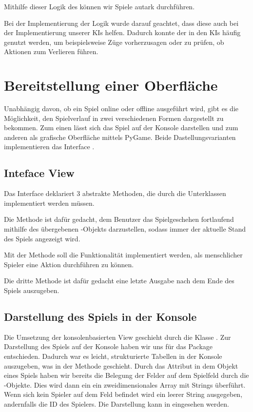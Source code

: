 Mithilfe dieser Logik des  können wir Spiele autark durchführen.

Bei der Implementierung der Logik wurde darauf geachtet, dass diese auch bei der Implementierung unserer \ac{KI}s
helfen.
Dadurch konnte der  in den \ac{KI}s häufig genutzt werden, um beispielsweise Züge vorherzusagen oder
zu prüfen, ob Aktionen zum Verlieren führen.

\section{Bereitstellung einer Oberfläche}
\label{sec:bereitstellung-oberflaeche}

Unabhängig davon, ob ein Spiel online oder offline ausgeführt wird, gibt es die Möglichkeit, den Spielverlauf in zwei
verschiedenen Formen dargestellt zu bekommen.
Zum einen lässt sich das Spiel auf der Konsole darstellen und zum anderen als grafische Oberfläche mittels PyGame.
Beide Dastellungsvarianten implementieren das Interface .

\subsection{Inteface View}
\label{subsec:interface-view}

Das Interface  deklariert 3 abstrakte Methoden, die durch die Unterklassen implementiert werden müssen.

Die Methode  ist dafür gedacht, dem Benutzer das Spielgeschehen fortlaufend mithilfe des
übergebenen -Objekts darzustellen, sodass immer der aktuelle Stand des Spiels angezeigt wird.

Mit der Methode  soll die Funktionalität implementiert werden, als menschlicher Spieler eine
Aktion durchführen zu können.

Die dritte Methode  ist dafür gedacht eine letzte Ausgabe nach dem Ende des Spiels auszugeben.

\subsection{Darstellung des Spiels in der Konsole}
\label{subsec:oberflaeche-konsole}

Die Umsetzung der konsolenbasierten View geschieht durch die Klasse .
Zur Darstellung des Spiels auf der Konsole haben wir uns für das Package  entschieden.
Dadurch war es leicht, strukturierte Tabellen in der Konsole auszugeben, was in der Methode 
geschieht.
Durch das Attribut  in dem Objekt eines Spiels haben wir bereits die Belegung der Felder auf dem Spielfeld
durch die -Objekte.
Dies wird dann ein ein zweidimensionales Array mit Strings überführt.
Wenn sich kein Spieler auf dem Feld befindet wird ein leerer String ausgegeben, andernfalls die ID des Spielers.
Die Darstellung kann in  eingesehen werden.\\

